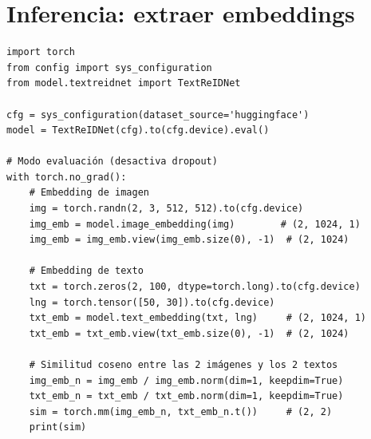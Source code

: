 \section{Inferencia: extraer embeddings}

\begin{verbatim}
import torch
from config import sys_configuration
from model.textreidnet import TextReIDNet

cfg = sys_configuration(dataset_source='huggingface')
model = TextReIDNet(cfg).to(cfg.device).eval()

# Modo evaluación (desactiva dropout)
with torch.no_grad():
    # Embedding de imagen
    img = torch.randn(2, 3, 512, 512).to(cfg.device)
    img_emb = model.image_embedding(img)        # (2, 1024, 1)
    img_emb = img_emb.view(img_emb.size(0), -1)  # (2, 1024)

    # Embedding de texto
    txt = torch.zeros(2, 100, dtype=torch.long).to(cfg.device)
    lng = torch.tensor([50, 30]).to(cfg.device)
    txt_emb = model.text_embedding(txt, lng)     # (2, 1024, 1)
    txt_emb = txt_emb.view(txt_emb.size(0), -1)  # (2, 1024)

    # Similitud coseno entre las 2 imágenes y los 2 textos
    img_emb_n = img_emb / img_emb.norm(dim=1, keepdim=True)
    txt_emb_n = txt_emb / txt_emb.norm(dim=1, keepdim=True)
    sim = torch.mm(img_emb_n, txt_emb_n.t())     # (2, 2)
    print(sim)
\end{verbatim}
